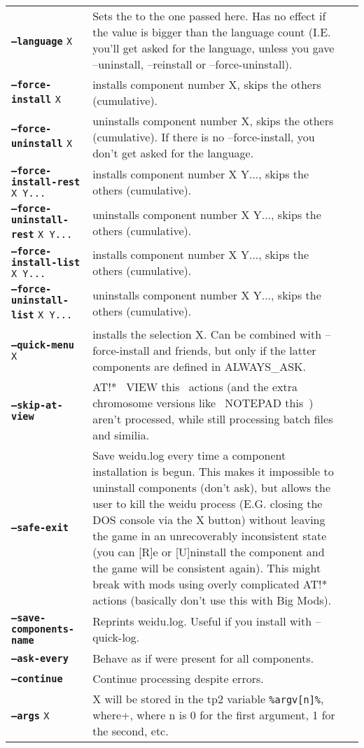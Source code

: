 \documentclass{article}
\def\ttref#1{\ahrefloc{#1}{\tt #1}}
\def\DEFINE#1{{\tt \bf #1}\label{#1}\index{#1}}
\def\t#1{{\tt #1}}
\begin{document}
\begin{tabular}{lp{10in}|p{10in}}
\DEFINE{--language}  \t{X}   & Sets the \ttref{TP2} \ttref{Language} to the one
passed here. Has no effect if the value is bigger than the language count
(I.E. you'll get asked for the language, unless you gave --uninstall, --reinstall
or --force-uninstall). \\
\DEFINE{--force-install} \t{X} & installs component number X, skips the others (cumulative). \\
\DEFINE{--force-uninstall} \t{X} & uninstalls component number X, skips the others (cumulative).
If there is no --force-install, you don't get asked for the language. \\
\DEFINE{--force-install-rest} \t{X Y...} & installs component number X Y...,
skips the others (cumulative). \\
\DEFINE{--force-uninstall-rest} \t{X Y...} & uninstalls component number X Y...,
skips the others (cumulative). \\
\DEFINE{--force-install-list} \t{X Y...} & installs component number X Y...,
skips the others (cumulative). \\
\DEFINE{--force-uninstall-list} \t{X Y...} & uninstalls component number X Y...,
skips the others (cumulative). \\
\DEFINE{--quick-menu} \t{X} & installs the \ttref{QUICK_MENU} selection X. Can be combined with
--force-install and friends, but only if the latter components are defined in ALWAYS_ASK.
\\
\DEFINE{--skip-at-view} & AT!* ~VIEW this~ actions (and the extra chromosome versions like
~NOTEPAD this~) aren't processed, while still processing batch files and similia. \\
\DEFINE{--safe-exit} & Save weidu.log every time a component installation is begun.
This makes it impossible to uninstall components (don't ask), but allows the user to kill
the weidu process (E.G. closing the DOS console via the X button) without leaving the game in an
unrecoverably inconsistent state (you can [R]e or [U]ninstall the component and the game will be
consistent again). This might break with mods using overly complicated AT!* actions (basically
don't use this with Big Mods). \\
\DEFINE{--save-components-name} & Reprints weidu.log. Useful if you install with --quick-log. \\
\DEFINE{--ask-every}    & Behave as if \ttref{ASK!EVERY!COMPONENT} were
present for all \ttref{TP2} components. \\
\DEFINE{--continue}     & Continue \ttref{TP2} processing despite
\ttref{TP2 Action} errors. \\
\DEFINE{--args} \t{X}       & X will be stored in the tp2 variable \verb+%argv[n]%+, where
n is 0 for the first argument, 1 for the second, etc.


\end{tabular}
\end{document}
